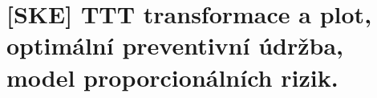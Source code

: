 \chapter{[SKE] TTT transformace a plot, optimální preventivní údržba, model proporcionálních rizik.}





